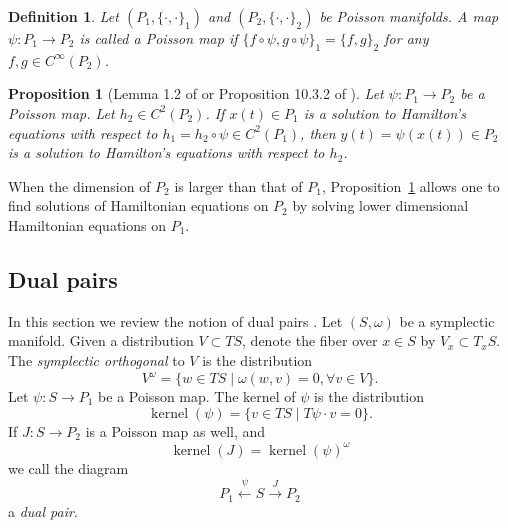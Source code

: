 \documentclass[12pt]{amsart}
\newtheorem{prop}[thm]{Proposition}
\newtheorem{defn}[thm]{Definition}
\DeclareMathOperator{\kernel}{kernel}
\begin{document}
\begin{defn}
  Let $(P_1, \{ \cdot , \cdot \}_1)$ and $(P_2, \{ \cdot , \cdot \}_2)$
  be Poisson manifolds.
  A map $\psi:P_1 \to P_2$ is called a
  \emph{Poisson map} if $\{ f \circ \psi , g \circ \psi \}_1 = \{ f , g \}_2$  for any $f,g \in C^{\infty}(P_2)$.
\end{defn}


\begin{prop}[Lemma 1.2 of \cite{Weinstein1983} or Proposition 10.3.2 of \cite{MandS}] \label{prop:Poisson_dynamics}
  Let $\psi:P_1 \to P_2$ be a Poisson map.
  Let $h_2 \in C^2(P_2)$.
  If $x(t) \in P_1$ is a solution to Hamilton's equations with respect
  to $h_1 = h_2 \circ \psi \in C^2(P_1)$, then $y(t) = \psi(x(t)) \in P_2$ is a solution
  to Hamilton's equations with respect to $h_2$.
\end{prop}

  When the dimension of $P_2$ is larger than that of $P_1$,
  Proposition~\ref{prop:Poisson_dynamics} allows one to find solutions of
  Hamiltonian equations on $P_2$
  by solving lower dimensional Hamiltonian equations
  on $P_1$.
  \subsection{Dual pairs}
  In this section we review the notion of dual pairs
  \cite{MarsdenWeinstein1983,Weinstein1983,GayBalmazVizman2012}.
  Let $(S,\omega)$ be a symplectic manifold.
  Given a distribution $V \subset TS$, denote the fiber over 
  $x \in S$ by $V_x \subset T_x S$.
  The \emph{symplectic orthogonal} to $V$ is the distribution
  \begin{equation*}
    V^\omega = \{ w \in TS \mid \omega( w , v ) = 0, \forall v \in V \}.
  \end{equation*}
  Let $\psi:S \to P_1$ be a Poisson map.
  The kernel of $\psi$ is the distribution
  \begin{equation*}
    \kernel(\psi) = \{ v \in TS \mid T\psi \cdot v  = 0 \}.
  \end{equation*}
  If $J:S \to P_2$ is a Poisson map as well, and
  \begin{equation*}
    \kernel(J) = \kernel(\psi)^\omega
  \end{equation*}
  we call the diagram
  \begin{equation*}
    P_1 \stackrel{\psi}{\longleftarrow} S \stackrel{J}{\longrightarrow} P_2
  \end{equation*}
  a \emph{dual pair}.
\end{document}
